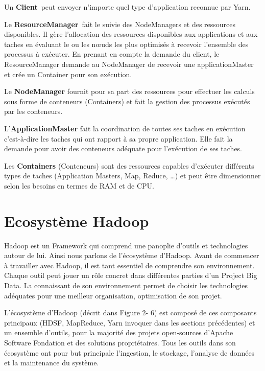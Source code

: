 \documentclass[12pt,english]{book}
\begin{document}

Un \textbf{Client} peut envoyer n’importe quel type d’application reconnue par Yarn. 

Le \textbf{ResourceManager} fait le suivie des NodeManagers et des ressources disponibles.
Il gère l’allocation des ressources disponibles aux applications et aux taches en évaluant le ou les nœuds les plus optimisés à recevoir l’ensemble des processus à exécuter.
En prenant en compte la demande du client, le ResourceManager demande au NodeManager de recevoir une applicationMaster et crée un Container pour son exécution.

Le \textbf{NodeManager} fournit pour sa part des ressources pour effectuer les calculs sous forme de conteneurs (Containers) et fait la gestion des processus exécutés par les conteneurs.

L’\textbf{ApplicationMaster} fait la coordination de toutes ses taches en exécution c’est-à-dire les taches qui ont rapport à sa propre application.
Elle fait la demande pour avoir des conteneurs adéquate pour l’exécution de ses taches.

Les \textbf{Containers} (Conteneurs) sont des ressources capables d’exécuter différents types de taches (Application Masters, Map, Reduce, …) et peut être dimensionner selon les besoins en termes de RAM et de CPU.

\section{Ecosystème Hadoop}

Hadoop est un Framework qui comprend une panoplie d’outils et technologies autour de lui. Ainsi nous parlons de l’écosystème d’Hadoop. Avant de commencer à travailler avec Hadoop, il est tant essentiel de comprendre son environnement. Chaque outil peut jouer un rôle concret dans différentes parties d’un Project Big Data. La connaissant de son environnement permet de choisir les technologies adéquates pour une meilleur organisation, optimisation de son projet.

L’écosystème d’Hadoop (décrit dans Figure 2- 6) est composé de ces composants principaux (HDSF, MapReduce, Yarn invoquer dans les sections précédentes) et un ensemble d’outils, pour la majorité des projets open-sources d’Apache Software Fondation et des solutions propriétaires.  Tous les outils dans son écosystème ont pour but principale l’ingestion, le stockage, l’analyse de données et la maintenance du système. 
\end{document}
